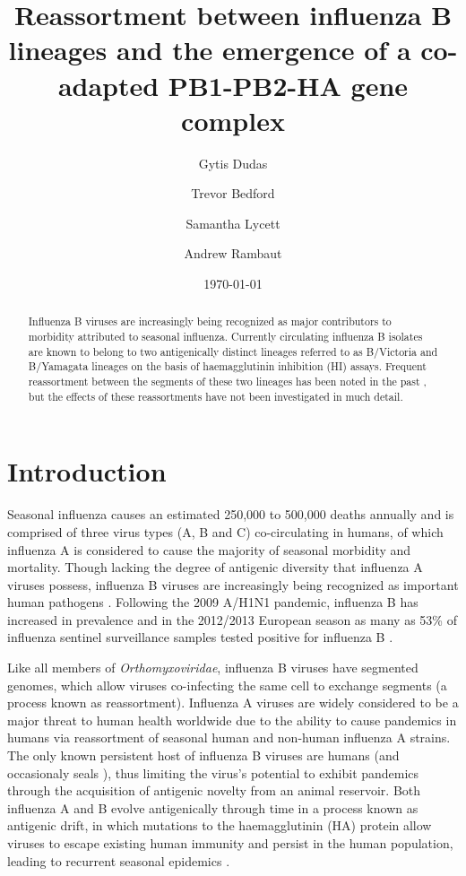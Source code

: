 \documentclass[11pt,oneside,letterpaper]{article}
\title{\vspace{1.0cm} \LARGE \bf Reassortment between influenza B lineages and the emergence of a co-adapted PB1-PB2-HA gene complex}
\author[1]{Gytis Dudas}
\author[2]{Trevor Bedford}
\author[1]{Samantha Lycett}
\author[1,3]{Andrew Rambaut}
\affil[1]{Institute of Evolutionary Biology, University of Edinburgh, Edinburgh, UK}
\affil[2]{Vaccine and Infectious Disease Division, Fred Hutchinson Cancer Research Center, Seattle, WA, USA}
\affil[3]{Fogarty International Center, National Institutes of Health, Bethesda, MD, USA}
\date{\today}
\begin{document}
\maketitle

\begin{abstract}

Influenza B viruses are increasingly being recognized as major contributors to morbidity attributed to seasonal influenza. 
Currently circulating influenza B isolates are known to belong to two antigenically distinct lineages referred to as B/Victoria and B/Yamagata lineages on the basis of haemagglutinin inhibition (HI) assays. 
Frequent reassortment between the segments of these two lineages has been noted in the past \cite{lindstrom1999}, but the effects of these reassortments have not been investigated in much detail.

\end{abstract}

\pagebreak

\section*{Introduction}
Seasonal influenza causes an estimated 250,000 to 500,000 deaths annually and is comprised of three virus types (A, B and C) co-circulating in humans, of which influenza A is considered to cause the majority of seasonal morbidity and mortality.
Though lacking the degree of antigenic diversity that influenza A viruses possess, influenza B viruses are increasingly being recognized as important human pathogens \cite{paul-glezen2013}.
Following the 2009 A/H1N1 pandemic, influenza B has increased in prevalence and in the 2012/2013 European season as many as 53\% of influenza sentinel surveillance samples tested positive for influenza B \cite{ECDC1213}. 

Like all members of \textit{Orthomyxoviridae}, influenza B viruses have segmented genomes, which allow viruses co-infecting the same cell to exchange segments (a process known as reassortment). 
Influenza A viruses are widely considered to be a major threat to human health worldwide due to the ability to cause pandemics in humans via reassortment of seasonal human and non-human influenza A strains. 
The only known persistent host of influenza B viruses are humans (and occasionaly seals \cite{osterhaus2000,bodewes2013}), thus limiting the virus's potential to exhibit pandemics through the acquisition of antigenic novelty from an animal reservoir. 
Both influenza A and B evolve antigenically through time in a process known as antigenic drift, in which mutations to the haemagglutinin (HA) protein allow viruses to escape existing human immunity and persist in the human population, leading to recurrent seasonal epidemics \cite{bedford2013}.
\end{document}
